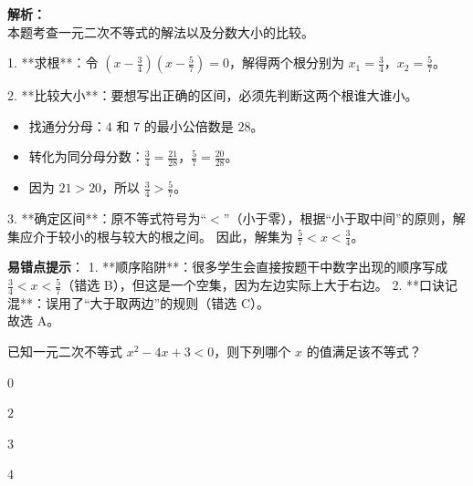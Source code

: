 \begin{solution}
    \textbf{解析：} \\
    本题考查一元二次不等式的解法以及分数大小的比较。
    
    1. **求根**：令 $\displaystyle \left(x - \frac{3}{4}\right)\left(x - \frac{5}{7}\right) = 0$，解得两个根分别为 $\displaystyle x_1 = \frac{3}{4}$，$\displaystyle x_2 = \frac{5}{7}$。
    
    2. **比较大小**：要想写出正确的区间，必须先判断这两个根谁大谁小。
    \begin{itemize}
        \item 找通分分母：$4$ 和 $7$ 的最小公倍数是 $28$。
        \item 转化为同分母分数：$\displaystyle \frac{3}{4} = \frac{21}{28}$，$\displaystyle \frac{5}{7} = \frac{20}{28}$。
        \item 因为 $21 > 20$，所以 $\displaystyle \frac{3}{4} > \frac{5}{7}$。
    \end{itemize}
    
    3. **确定区间**：原不等式符号为“$<$”（小于零），根据“小于取中间”的原则，解集应介于较小的根与较大的根之间。
    因此，解集为 $\displaystyle \frac{5}{7} < x < \frac{3}{4}$。
    
    \textbf{易错点提示}：
    1. **顺序陷阱**：很多学生会直接按题干中数字出现的顺序写成 $\displaystyle \frac{3}{4} < x < \frac{5}{7}$（错选 B），但这是一个空集，因为左边实际上大于右边。
    2. **口诀记混**：误用了“大于取两边”的规则（错选 C）。 \\
    故选 A。
\end{solution}

\begin{question}
    已知一元二次不等式 $x^2 - 4x + 3 < 0$，则下列哪个 $x$ 的值满足该不等式？ \paren[B]
    \begin{choices}
        \item $0$ \item $2$ \item $3$ \item $4$
    \end{choices}
\end{question}

